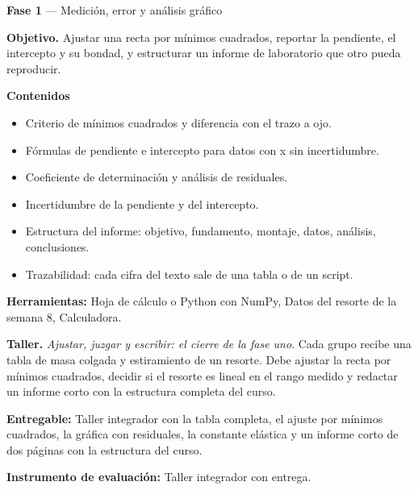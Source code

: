 \documentclass[11pt,a4paper]{article}
\begin{document}
\begin{tcolorbox}[cajaContenido,title={Semana 4 --- Mínimos cuadrados y estructura del informe}]
\textbf{Fase 1} --- Medición, error y análisis gráfico

\textbf{Objetivo.} Ajustar una recta por mínimos cuadrados, reportar la pendiente, el intercepto y su bondad, y estructurar un informe de laboratorio que otro pueda reproducir.

\textbf{Contenidos}

\begin{itemize}[leftmargin=1.4em,itemsep=2pt,topsep=3pt]
  \item Criterio de mínimos cuadrados y diferencia con el trazo a ojo.
  \item Fórmulas de pendiente e intercepto para datos con x sin incertidumbre.
  \item Coeficiente de determinación y análisis de residuales.
  \item Incertidumbre de la pendiente y del intercepto.
  \item Estructura del informe: objetivo, fundamento, montaje, datos, análisis, conclusiones.
  \item Trazabilidad: cada cifra del texto sale de una tabla o de un script.
\end{itemize}

\textbf{Herramientas:} Hoja de cálculo o Python con NumPy, Datos del resorte de la semana 8, Calculadora.

\textbf{Taller.} \emph{Ajustar, juzgar y escribir: el cierre de la fase uno}. Cada grupo recibe una tabla de masa colgada y estiramiento de un resorte. Debe ajustar la recta por mínimos cuadrados, decidir si el resorte es lineal en el rango medido y redactar un informe corto con la estructura completa del curso.

\textbf{Entregable:} Taller integrador con la tabla completa, el ajuste por mínimos cuadrados, la gráfica con residuales, la constante elástica y un informe corto de dos páginas con la estructura del curso.

\textbf{Instrumento de evaluación:} Taller integrador con entrega.
\end{tcolorbox}
\end{document}
